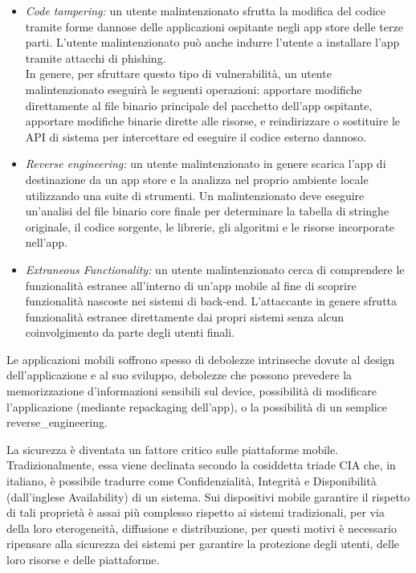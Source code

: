 \begin{itemize}
    \item \textit{Code tampering:}
    un utente malintenzionato sfrutta la modifica del codice tramite forme dannose delle applicazioni ospitante negli app store delle terze parti.
    L'utente malintenzionato può anche indurre l'utente a installare l'app tramite attacchi di phishing.\\
    In genere, per sfruttare questo tipo di vulnerabilità, un utente malintenzionato eseguirà le seguenti operazioni: apportare modifiche direttamente al file binario principale del pacchetto dell'app ospitante, apportare modifiche binarie dirette alle risorse, e reindirizzare o sostituire le API di sistema per intercettare ed eseguire il codice esterno dannoso.

    \item \textit{Reverse engineering:}
    un utente malintenzionato in genere scarica l'app di destinazione da un app store e la analizza nel proprio ambiente locale utilizzando una suite di strumenti.
    Un malintenzionato deve eseguire un'analisi del file binario core finale per determinare la tabella di stringhe originale, il codice sorgente, le librerie, gli algoritmi e le risorse incorporate nell'app.
    \item \textit{Extraneous Functionality:}
    un utente malintenzionato cerca di comprendere le funzionalità estranee all'interno di un'app mobile  al fine di scoprire funzionalità nascoste nei sistemi di back-end.
    L'attaccante in genere sfrutta funzionalità estranee direttamente dai propri sistemi senza alcun coinvolgimento da parte degli utenti finali.
\end{itemize}
Le applicazioni mobili soffrono spesso di debolezze intrinseche dovute al design dell'applicazione e al suo sviluppo, debolezze che possono prevedere la memorizzazione d'informazioni sensibili sul device, possibilità di modificare l'applicazione (mediante \gls{repackaging} dell'app), o la possibilità di un semplice \gls{reverse_engineering}.

La sicurezza è diventata un fattore critico sulle piattaforme mobile.
Tradizionalmente, essa viene declinata secondo la cosiddetta triade CIA\cite{samonas2014cia} che, in italiano, è possibile tradurre come Confidenzialità, Integrità e Disponibilità (dall'inglese Availability) di un sistema.
Sui dispositivi mobile garantire il rispetto di tali proprietà è assai più complesso rispetto ai sistemi tradizionali, per via della loro eterogeneità, diffusione e distribuzione, per questi motivi è necessario ripensare alla sicurezza dei sistemi per garantire la protezione degli utenti, delle loro risorse e delle piattaforme.

